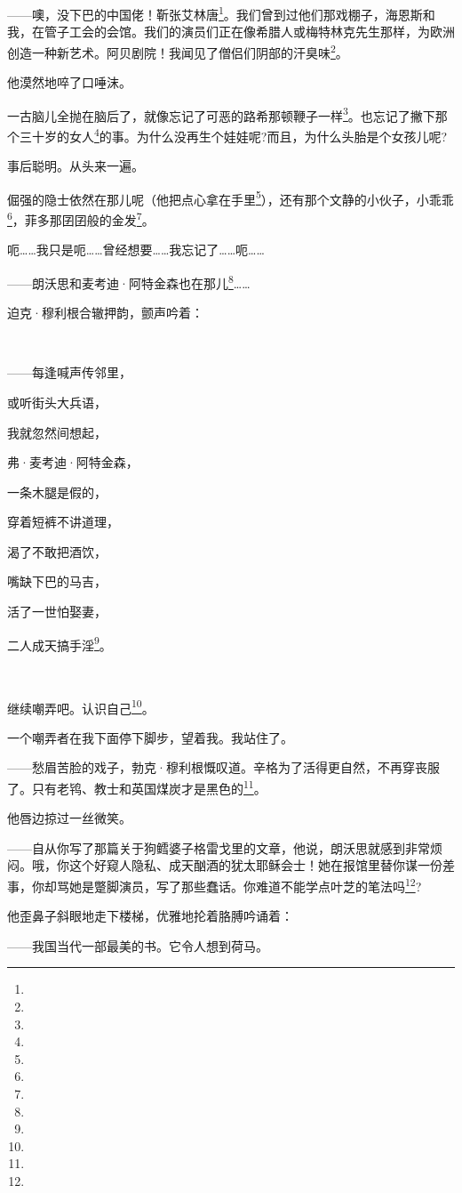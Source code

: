 \par ——噢，没下巴的中国佬！靳张艾林唐\footnote{}。我们曾到过他们那戏棚子，海恩斯和我，在管子工会的会馆。我们的演员们正在像希腊人或梅特林克先生那样，为欧洲创造一种新艺术。阿贝剧院！我闻见了僧侣们阴部的汗臭味\footnote{}。
\par 他漠然地啐了口唾沫。
\par 一古脑儿全抛在脑后了，就像忘记了可恶的路希那顿鞭子一样\footnote{}。也忘记了撇下那个三十岁的女人\footnote{}的事。为什么没再生个娃娃呢?而且，为什么头胎是个女孩儿呢?
\par 事后聪明。从头来一遍。
\par 倔强的隐士依然在那儿呢（他把点心拿在手里\footnote{}），还有那个文静的小伙子，小乖乖\footnote{}，菲多那囝囝般的金发\footnote{}。
\par 呃……我只是呃……曾经想要……我忘记了……呃……
\par ——朗沃思和麦考迪·阿特金森也在那儿\footnote{}……
\par 迫克·穆利根合辙押韵，颤声吟着：
\par  
\par ——每逢喊声传邻里，
\par 或听街头大兵语，
\par 我就忽然间想起，
\par 弗·麦考迪·阿特金森，
\par 一条木腿是假的，
\par 穿着短裤不讲道理，
\par 渴了不敢把酒饮，
\par 嘴缺下巴的马吉，
\par 活了一世怕娶妻，
\par 二人成天搞手淫\footnote{}。
\par  
\par 继续嘲弄吧。认识自己\footnote{}。
\par 一个嘲弄者在我下面停下脚步，望着我。我站住了。
\par ——愁眉苦脸的戏子，勃克·穆利根慨叹道。辛格为了活得更自然，不再穿丧服了。只有老鸨、教士和英国煤炭才是黑色的\footnote{}。
\par 他唇边掠过一丝微笑。
\par ——自从你写了那篇关于狗鳕婆子格雷戈里的文章，他说，朗沃思就感到非常烦闷。哦，你这个好窥人隐私、成天酗酒的犹太耶稣会士！她在报馆里替你谋一份差事，你却骂她是蹩脚演员，写了那些蠢话。你难道不能学点叶芝的笔法吗\footnote{}?
\par 他歪鼻子斜眼地走下楼梯，优雅地抡着胳膊吟诵着：
\par ——我国当代一部最美的书。它令人想到荷马。

